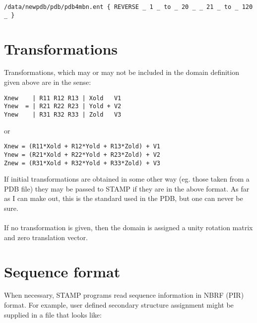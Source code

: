 \begin{scriptsize}\begin{verbatim}
/data/newpdb/pdb/pdb4mbn.ent { REVERSE _ 1 _ to _ 20 _ _ 21 _ to _ 120 _ } 
\end{verbatim} \end{scriptsize}


\section{Transformations}

Transformations, which may or may not be included in the domain 
definition given above are in the sense:\\

\begin{scriptsize}\begin{verbatim}
Xnew    | R11 R12 R13 | Xold   V1
Ynew  = | R21 R22 R23 | Yold + V2
Ynew    | R31 R32 R33 | Zold   V3
\end{verbatim} \end{scriptsize}

or\\

\begin{scriptsize}\begin{verbatim}
Xnew = (R11*Xold + R12*Yold + R13*Zold) + V1
Ynew = (R21*Xold + R22*Yold + R23*Zold) + V2
Znew = (R31*Xold + R32*Yold + R33*Zold) + V3
\end{verbatim} \end{scriptsize}

If initial transformations are obtained in some other way (eg.
those taken from a PDB file) they may be passed to STAMP if they
are in the above format.  As far as I can make out, this is the
standard used in the PDB, but one can never be sure.  \\
\\
If no transformation is given, then the domain is assigned a
unity rotation matrix and zero translation vector.

\section{Sequence format}

When necessary, STAMP programs read sequence information in  NBRF (PIR) 
format.  For example, user defined secondary structure assignment 
might be supplied in a file that looks like:\\


